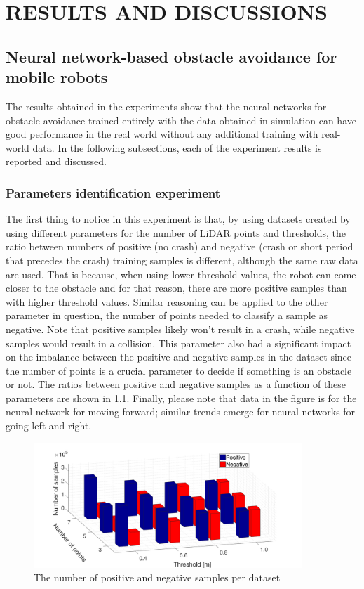 \chapter{RESULTS AND DISCUSSIONS}
\label{chap:Results}

\section{Neural network-based obstacle avoidance for mobile robots}

The results obtained in the experiments show that the neural networks for obstacle avoidance trained entirely with the data obtained in simulation can have good performance in the real world without any additional training with real-world data. In the following subsections, each of the experiment results is reported and discussed.

\subsection{Parameters identification experiment}\label{Sec:ResLabelling}

The first thing to notice in this experiment is that, by using datasets created by using different parameters for the number of LiDAR points and thresholds, the ratio between numbers of positive (no crash) and negative (crash or short period that precedes the crash) training samples is different, although the same raw data are used. That is because, when using lower threshold values, the robot can come closer to the obstacle and for that reason, there are more positive samples than with higher threshold values. Similar reasoning can be applied to the other parameter in question, the number of points needed to classify a sample as negative. Note that positive samples likely won't result in a crash, while negative samples would result in a collision. This parameter also had a significant impact on the imbalance between the positive and negative samples in the dataset since the number of points is a crucial parameter to decide if something is an obstacle or not. The ratios between positive and negative samples as a function of these parameters are shown in \cref{fig:Brojevi}. Finally, please note that data in the figure is for the neural network for moving forward; similar trends emerge for neural networks for going left and right.

\begin{figure}
\centering
\includegraphics[width=0.9\textwidth]{slike/Fig04_01.png}
\caption{The number of positive and negative samples per dataset}
\label{fig:Brojevi}
\end{figure}

